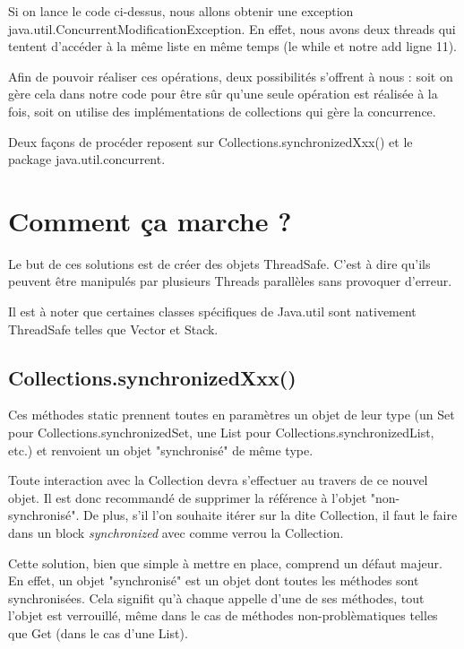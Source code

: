 \documentclass{report}
\begin{document}
			Si on lance le code ci-dessus, nous allons obtenir une exception java.util.ConcurrentModificationException.
			En effet, nous avons deux threads qui tentent d'accéder à la même liste en même temps (le while et notre add ligne 11).
			
			Afin de pouvoir réaliser ces opérations, deux possibilités s'offrent à nous : soit on gère cela dans notre code pour être sûr qu'une seule opération est réalisée à la fois, soit on utilise des implémentations de collections qui gère la concurrence.
			
			Deux façons de procéder reposent sur Collections.synchronizedXxx() et le package java.util.concurrent.
			
	\chapter{Comment ça marche ?}

		Le but de ces solutions est de créer des objets ThreadSafe. C'est à dire qu'ils peuvent être manipulés par plusieurs Threads parallèles sans provoquer d'erreur.

		Il est à noter que certaines classes spécifiques de Java.util sont nativement ThreadSafe telles que Vector et Stack.

		\section{Collections.synchronizedXxx()}

			Ces méthodes static prennent toutes en paramètres un objet de leur type (un Set pour Collections.synchronizedSet, une List pour Collections.synchronizedList, etc.) et renvoient un objet "synchronisé" de même type.

			Toute interaction avec la Collection devra s'effectuer au travers de ce nouvel objet.
			Il est donc recommandé de supprimer la référence à l'objet "non-synchronisé".
			De plus, s'il l'on souhaite itérer sur la dite Collection, il faut le faire dans un block \textit{synchronized} avec comme verrou la Collection.

			Cette solution, bien que simple à mettre en place, comprend un défaut majeur.
			En effet, un objet "synchronisé" est un objet dont toutes les méthodes sont synchronisées.
			Cela signifit qu'à chaque appelle d'une de ses méthodes, tout l'objet est verrouillé, même dans le cas de méthodes non-problèmatiques telles que Get (dans le cas d'une List).

\end{document}
